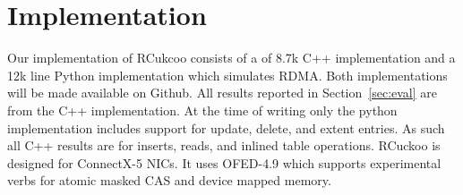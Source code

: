 \section{Implementation}

Our implementation of RCukcoo consists of a of 8.7k C++
implementation and a 12k line Python implementation which
simulates RDMA. Both implementations will be made available
on Github.  All results reported in Section~\ref{sec:eval}
are from the C++ implementation. At the time of writing only
the python implementation includes support for update,
delete, and extent entries. As such all C++ results are for
inserts, reads, and inlined table operations.  RCuckoo is
designed for ConnectX-5 NICs. It uses OFED-4.9 which
supports experimental verbs for atomic masked CAS and device
mapped memory. 
